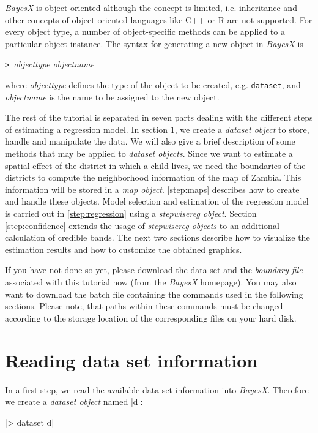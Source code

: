 {\it BayesX} is object oriented although the concept is limited, i.e. inheritance and other concepts of object oriented
languages like C++ or R are not supported. For every object type, a number of object-specific methods can be applied to a
particular object instance. The syntax for generating a new object in {\it BayesX} is

{\tt> }{\it objecttype objectname}

where {\it objecttype} defines the type of the object to be created, e.g. {\tt dataset}, and {\it objectname} is the name to be
assigned to the new object.

The rest of the tutorial is separated in seven parts dealing with the different steps of estimating a regression model. In
section \ref{step:datasets}, we create a {\it dataset object} to store, handle and manipulate the data. We will also give a
brief description of some methods that may be applied to {\it dataset objects}. Since we want to estimate a spatial effect of
the district in which a child lives, we need the boundaries of the districts to compute the neighborhood information of the map
of Zambia. This information will be stored in a {\it map object}. \ref{step:maps} describes how to create and handle these
objects. Model selection and estimation of the regression model is carried out in \ref{step:regression} using a {\it
stepwisereg object}. Section \ref{step:confidence} extends the usage of {\it stepwisereg objects} to an additional calculation
of credible bands. The next two sections describe how to visualize the estimation results and how to customize the obtained
graphics.

If you have not done so yet, please download the data set and the {\it boundary file} associated with this tutorial now (from
the {\it BayesX} homepage). You may also want to download the batch file containing the commands used in the following
sections. Please note, that paths within these commands must be changed according to the storage location of the corresponding
files on your hard disk.

\section{Reading data set information}\label{step:datasets}

In a first step, we read the available data set information into {\it BayesX}. Therefore we create a {\it dataset object} named
|d|:

|> dataset d|

